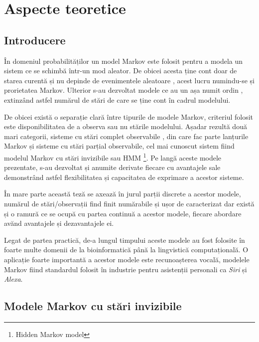 \chapter{Aspecte teoretice}

\section{Introducere}

În domeniul probabilităților un model Markov este folosit pentru a modela un sistem ce se schimbă într-un mod aleator. De obicei acesta ține cont doar de starea curentă și nu depinde de evenimentele aleatoare , acest lucru numindu-se și prorietatea Markov. Ulterior s-au dezvoltat modele ce au un așa numit ordin , extinzând astfel numărul de stări de care se ține cont în cadrul modelului.\par

De obicei există o separație clară între tipurile de modele Markov, criteriul folosit este disponibilitatea de a observa sau nu stările modelului. Așadar rezultă două mari categorii, sisteme cu stări complet observabile , din care fac parte lanțurile Markov și sisteme cu stări parțial observabile, cel mai cunoscut sistem fiind modelul Markov cu stări invizibile sau HMM \footnote{Hidden Markov model}. Pe langă aceste modele prezentate, s-au dezvoltat și anumite derivate fiecare cu avantajele sale demonstrând astfel flexibilitatea și capacitatea de exprimare a acestor sisteme.\par

În mare parte această teză se axează în jurul parții discrete a acestor modele, numărul de stări/observații find finit numărabile și ușor de caracterizat dar există și o ramură ce se ocupă cu partea continuă a acestor modele, fiecare abordare avănd avantajele și dezavantajele ei.\par

Legat de partea practică, de-a lungul timpului aceste modele au fost folosite în foarte multe domenii de la bioinformatică până la lingvistică computațională. O aplicație foarte importantă a acestor modele este recunoașterea vocală, modelele Markov fiind standardul folosit în industrie pentru asistenții personali ca \textit{Siri} și \textit{Alexa}.\par

\section{Modele Markov cu stări invizibile}

